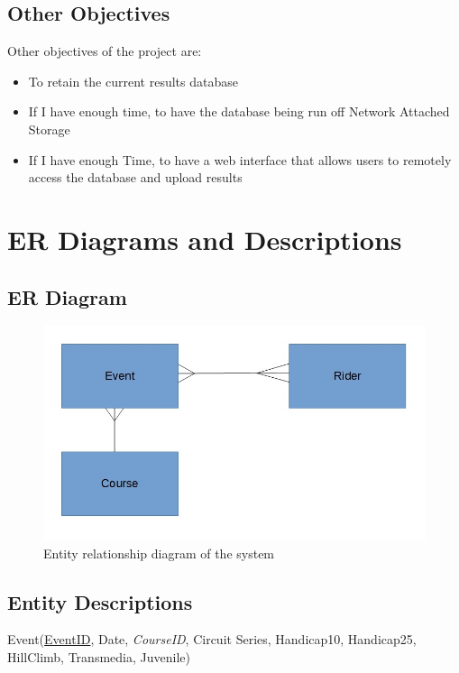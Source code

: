 \subsection{Other Objectives}
Other objectives of the project are:
\begin{itemize}
	\item To retain the current results database
	\item If I have enough time, to have the database being run off Network Attached Storage
	\item If I have enough Time, to have a web interface that allows users to remotely access the database and upload results
\end{itemize}

\section{ER Diagrams and Descriptions}

\subsection{ER Diagram}

\begin{figure}[H]

	\includegraphics[width=\textwidth]{./ER.jpg}
	\caption{Entity relationship diagram of the system}
\end{figure}



\subsection{Entity Descriptions}
Event(\underline{EventID}, Date, \emph{CourseID}, Circuit Series, Handicap10, Handicap25, HillClimb, Transmedia, Juvenile)


